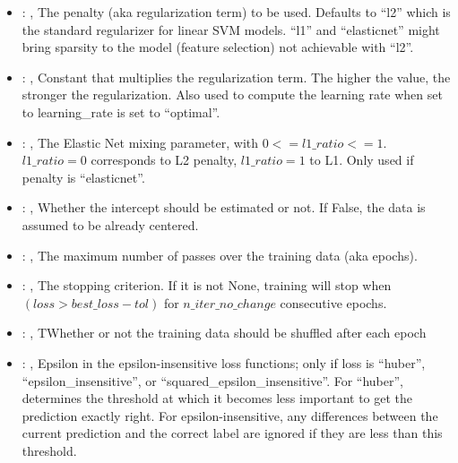 \begin{itemize}
    \item {}: \xmlDesc{[l2, l1, elasticnet]},
      The penalty (aka regularization term) to be used. Defaults to ``l2'' which is the standard
      regularizer for linear SVM models.                                                  ``l1'' and
      ``elasticnet'' might bring sparsity to the model (feature selection) not achievable with
      ``l2''.

    \item {}: ,
      Constant that multiplies the regularization term. The higher the value, the stronger the
      regularization. Also used to compute                                                  the
      learning rate when set to learning\_rate is set to ``optimal''.

    \item {}: ,
      The Elastic Net mixing parameter, with $0 <= l1\_ratio <= 1$. $l1\_ratio=0$ corresponds to L2
      penalty, $l1\_ratio=1$ to L1.                                                  Only used if
      penalty is ``elasticnet''.

    \item {}: ,
      Whether the intercept should be estimated or not. If False,
      the data is assumed to be already centered.

    \item {}: ,
      The maximum number of passes over the training data (aka epochs).

    \item {}: ,
      The stopping criterion. If it is not None, training will stop when $(loss > best\_loss - tol)$
      for $n\_iter\_no\_change$                                                  consecutive epochs.

    \item {}: ,
      TWhether or not the training data should be shuffled after each epoch

    \item {}: ,
      Epsilon in the epsilon-insensitive loss functions; only if loss is ``huber'',
      ``epsilon\_insensitive'', or
      ``squared\_epsilon\_insensitive''. For ``huber'', determines the threshold at which it becomes
      less important to get the                                                  prediction exactly
      right. For epsilon-insensitive, any differences between the current prediction and the correct
      label                                                  are ignored if they are less than this
      threshold.


\end{itemize}
